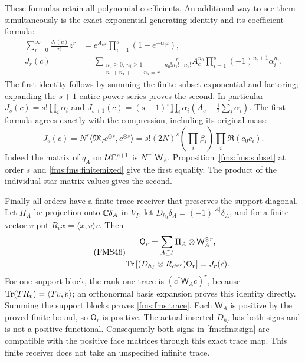 These formulas retain all polynomial coefficients. An additional
way to see them simultaneously is the exact exponential generating
identity and its coefficient formula:
\begin{equation}\tag{FMS44}\label{fms:fms:generating}
 \begin{split}
 \sum_{r=0}^\infty\frac{J_r(c)}{r!}z^r
     &=e^{A_cz}\prod_{i=1}^s(1-e^{-\alpha_i z}),\\
 J_r(c)&=
 \sum_{\substack{n_0\ge0,\ n_i\ge1\\n_0+n_1+\cdots+n_s=r}}
 \frac{r!}{n_0!n_1!\cdots n_s!}
 A_c^{n_0}\prod_{i=1}^s
                   (-1)^{n_i+1}\alpha_i^{n_i}.
 \end{split}
\end{equation}
The first identity follows by summing the finite subset exponential
and factoring; expanding the $s+1$ entire power series proves the
second. In particular
$J_s(c)=s!\prod_i\alpha_i$ and
$J_{s+1}(c)=(s+1)!\prod_i\alpha_i
             (A_c-\frac12\sum_i\alpha_i)$.
The first formula agrees exactly with the compression, including
its original mass:
\begin{equation}\tag{FMS45}\label{fms:fms:nfactor}
 J_s(c)=N^s
 \langle\mathfrak M_Ic^{\otimes s},c^{\otimes s}\rangle
 =s!(2N)^s\left(\prod_i\beta_i\right)
                  \prod_i\Re(\overline{c_0}c_i).
\end{equation}
Indeed the matrix of $q_A$ on $\mathcal U\mathbb C^{s+1}$ is
$N^{-1}\mathsf W_A$. Proposition~\ref{fms:fms:subset} at order $s$
and \eqref{fms:fms:finitemixed} give the first equality. The product
of the individual star-matrix values gives the second.

Finally all orders have a finite trace receiver that preserves the
support diagonal.  Let $\Pi_A$ be projection onto $\mathbb C\delta_A$
in $V_I$, let $D_{h_I}\delta_A=(-1)^{|A|}\delta_A$, and for a
finite vector $v$ put $R_vx=\langle x,v\rangle v$. Then
\begin{equation}\tag{FMS46}\label{fms:fms:trace}
 \begin{gathered}
 \mathsf O_r=\sum_{A\subseteq I}\Pi_A\otimes\mathsf W_A^{\otimes r},
 \\
 \operatorname{Tr}\left[(D_{h_I}\otimes R_{c^{\otimes r}})\mathsf O_r\right]
       =J_r(c).
 \end{gathered}
\end{equation}
For one support block, the rank-one trace is
$(c^*\mathsf W_Ac)^r$, because
$\operatorname{Tr}(TR_v)=\langle Tv,v\rangle$; an orthonormal basis expansion
proves this identity directly. Summing the support blocks proves
\eqref{fms:fms:trace}. Each $\mathsf W_A$ is positive by the proved
finite bound, so $\mathsf O_r$ is positive. The actual inserted
$D_{h_I}$ has both signs and is not a positive functional.
Consequently both signs in \eqref{fms:fms:sign} are compatible with
the positive face matrices through this exact trace map.
This finite receiver does not take an unspecified infinite trace.


